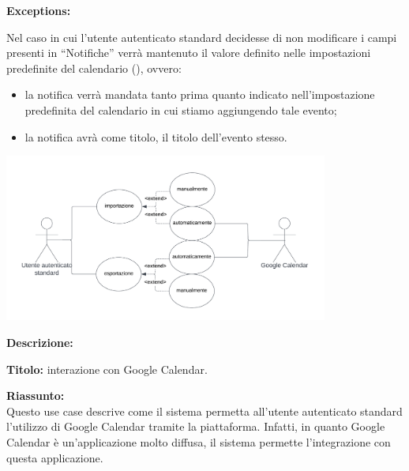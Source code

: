 \begin{listaPersonale}[UC]{}
    \textbf{Exceptions:}
    \begin{enumerate}[label=\textbf{[exception \arabic{enumii}]}, ref= \textbf{[exception \arabic{enumii}]}]
         Nel caso in cui l'utente autenticato standard decidesse di non modificare i campi presenti in “Notifiche” verrà mantenuto il valore definito nelle impostazioni predefinite del calendario (), ovvero:
        \begin{itemize}
            \item la notifica verrà mandata tanto prima quanto indicato nell'impostazione predefinita del calendario in cui stiamo aggiungendo tale evento;
            \item la notifica avrà come titolo, il titolo dell'evento stesso.
        \end{itemize}
    \end{enumerate}






    \newpage


    \begin{center}
        \includegraphics[width=0.8\textwidth]{img/Diagrammi/UseCases/GoogleCalendar.png}
    \end{center}

    \textbf{Descrizione:}

    \textbf{Titolo:} interazione con Google Calendar.

    \textbf{Riassunto:} \\
    Questo use case descrive come il sistema permetta all'utente autenticato standard l'utilizzo di Google Calendar tramite la piattaforma. Infatti, in quanto Google Calendar è un'applicazione molto diffusa, il sistema permette l'integrazione con questa applicazione.


\end{listaPersonale}
